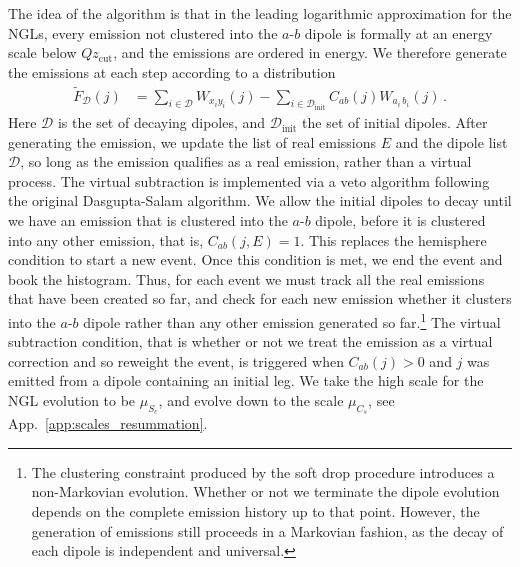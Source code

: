 \documentclass[a4paper,11pt]{article}
\def\zcut{z_{\text{cut}}}
\DeclareRobustCommand{\App}[1]{App.~\ref{#1}}
\begin{document}
The idea of the algorithm is that in the leading logarithmic approximation for the NGLs, every emission not clustered into the $a$-$b$ dipole is formally at an energy scale below $Q\zcut$, and the emissions are ordered in energy. We therefore generate the emissions at each step according to a distribution
\begin{align}
\tilde{F}_{\mathcal{D}}(j)&=\sum_{i\in \mathcal{D}}W_{x_iy_i}(j)-\sum_{i\in \mathcal{D}_{\text{init}}}C_{ab}(j)W_{a_i\,b_i}(j)\,.
\end{align}
Here $\mathcal{D}$ is the set of decaying dipoles, and $\mathcal{D}_{\text{init}}$ the set of initial dipoles. After generating the emission, we update the list of real emissions $E$ and the dipole list $\mathcal{D}$, so long as the emission qualifies as a real emission, rather than a virtual process. The virtual subtraction is implemented via a veto algorithm following the original Dasgupta-Salam algorithm. We allow the initial dipoles to decay until we have an emission that is clustered into the $a$-$b$ dipole, before it is clustered into any other emission, that is, $C_{ab}(j,E)=1$. This replaces the hemisphere condition to start a new event. Once this condition is met, we end the event and book the histogram. Thus, for each event we must track all the real emissions that have been created so far, and check for each new emission whether it clusters into the $a$-$b$ dipole rather than any other emission generated so far.\footnote{The clustering constraint produced by the soft drop procedure introduces a non-Markovian evolution. Whether or not we terminate the dipole evolution depends on the complete emission history up to that point. However, the generation of emissions still proceeds in a Markovian fashion, as the decay of each dipole is independent and universal.} The virtual subtraction condition, that is whether or not we treat the emission as a virtual correction and so reweight the event, is triggered when $C_{ab}(j)>0$ and $j$ was emitted from a dipole containing an initial leg. We take the high scale for the NGL evolution to be $\mu_{S_c}$, and evolve down to the scale $\mu_{C_s}$, see \App{app:scales_resummation}.



\end{document}
